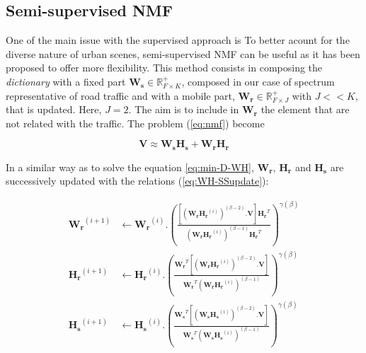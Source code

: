 \documentclass[twocolumn,a4paper,10pt]{article}
\begin{document}
\subsection{Semi-supervised NMF}

One of the main issue with the supervised approach is To better acount for the diverse nature of urban scenes, semi-supervised NMF can be useful as it has been proposed \cite{lee_semi-supervised_2010}  to offer more flexibility. This method consists in composing the \textit{dictionary} with a fixed part $\mathbf{W_s} \in \mathbb{R}^+_{F\times K}$, composed in our case of spectrum representative of road traffic and with a mobile part, $\mathbf{W_r} \in \mathbb{R}^+_{F\times J}$ with $J <<K$, that is updated. Here, $J = 2$. The aim is to include in $\mathbf{W_r}$ the element that are not related with the traffic. The problem (\ref{eq:nmf}) become

\begin{equation}
\mathbf{V} \approx \mathbf{W_s H_s}+ \mathbf{W_r H_r}
\end{equation}

In a similar way as to solve the equation \ref{eq:min-D-WH}, $\mathbf{W_r}$, $\mathbf{H_r}$ and $\mathbf{H_s}$ are successively updated with the relations (\ref{eq:WH-SSupdate}):

{\scriptsize
\begin{subequations}\label{eq:WH-SSupdate}
\begin{align}
\mathbf{W_r}^{(i+1)} &\leftarrow \mathbf{W_r}^{(i)}.\left(\frac{\left[\left(\mathbf{W_r H_r}^{(i)} \right)^{(\beta-2)}.\mathbf{V} \right]\mathbf{H_r}^T}{\left(\mathbf{W_r H_r}^{(i)} \right)^{(\beta-1)}\mathbf{H_r}^T}\right)^{\gamma(\beta)}\label{eq:W_r_SS}\\
\mathbf{H_r}^{(i+1)} &\leftarrow \mathbf{H_r}^{(i)}.\left(\frac{\mathbf{W_r}^T \left[\left(\mathbf{W_r H_r}^{(i)} \right)^{(\beta-2)}.\mathbf{V} \right]}{\mathbf{W_r}^T \left(\mathbf{W_r H_r}^{(i)} \right)^{(\beta-1)}}\right)^{\gamma(\beta)}\label{eq:H_r_SS}\\
\mathbf{H_s}^{(i+1)} &\leftarrow \mathbf{H_s}^{(i)}.\left(\frac{\mathbf{W_s}^T \left[\left(\mathbf{W_s H_s}^{(i)} \right)^{(\beta-2)}.\mathbf{V} \right]}{\mathbf{W_s}^T \left(\mathbf{W_s H_s}^{(i)} \right)^{(\beta-1)}}\right)^{\gamma(\beta)}\label{eq:H_s_SS}
\end{align}
\end{subequations}}

\end{document}

